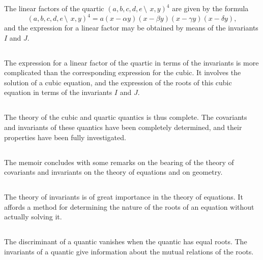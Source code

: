 \documentclass[12pt,a4paper]{article}
\begin{document}
The linear factors of the quartic $(a, b, c, d, e\,\setminus\!\!\:\, x, y)^4$ are given by the formula
\[
(a, b, c, d, e\,\setminus\!\!\:\, x, y)^4 = a(x - \alpha y)(x - \beta y)(x - \gamma y)(x - \delta y),
\]
and the expression for a linear factor may be obtained by means of the invariants $I$ and $J$.

\subsection{}

The expression for a linear factor of the quartic in terms of the invariants is more complicated than the corresponding expression for the cubic. It involves the solution of a cubic equation, and the expression of the roots of this cubic equation in terms of the invariants $I$ and $J$.

\subsection{}

The theory of the cubic and quartic quantics is thus complete. The covariants and invariants of these quantics have been completely determined, and their properties have been fully investigated.

\subsection{}

The memoir concludes with some remarks on the bearing of the theory of covariants and invariants on the theory of equations and on geometry.

\subsection{}

The theory of invariants is of great importance in the theory of equations. It affords a method for determining the nature of the roots of an equation without actually solving it.

\subsection{}

The discriminant of a quantic vanishes when the quantic has equal roots. The invariants of a quantic give information about the mutual relations of the roots.

\subsection{}
\end{document}
